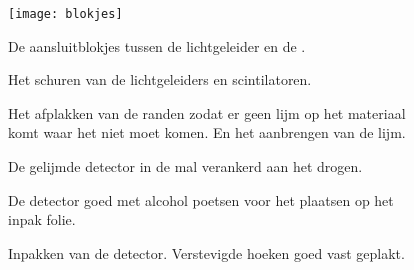 \begin{figure}
    \centering
    \texttt{[image: blokjes]}
    \label{fig:blokjes}
    \caption{De aansluitblokjes tussen de lichtgeleider en de \pmt.}
\end{figure}

\begin{figure}
    \centering
    \caption{Het schuren van de lichtgeleiders en scintilatoren.}
\end{figure}

\begin{figure}
    \centering
    \caption{Het afplakken van de randen zodat er geen lijm op het
             materiaal komt waar het niet moet komen. En het aanbrengen
             van de lijm.}
\end{figure}

\begin{figure}
    \centering
    \caption{De gelijmde detector in de mal verankerd aan het drogen.}
\end{figure}

\begin{figure}
    \centering
    \caption{De detector goed met alcohol poetsen voor het plaatsen op
             het inpak folie.}
\end{figure}

\begin{figure}
    \centering
    \caption{Inpakken van de detector. Verstevigde hoeken goed vast geplakt.}
\end{figure}

